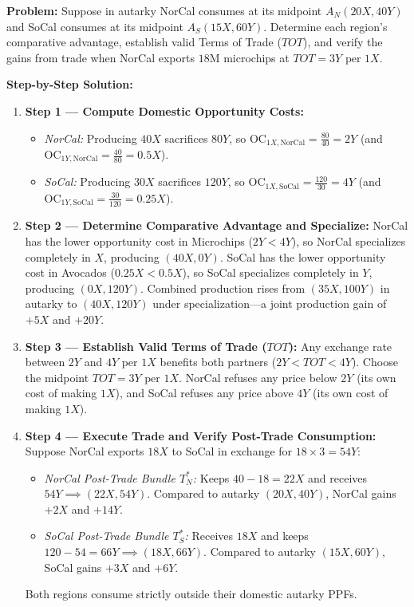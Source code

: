 \documentclass[11pt,letterpaper]{article}
\begin{document}
\begin{casestudy}
\textbf{Problem:} Suppose in autarky NorCal consumes at its midpoint $A_N(20X, 40Y)$ and SoCal consumes at its midpoint $A_S(15X, 60Y)$. Determine each region's comparative advantage, establish valid Terms of Trade ($TOT$), and verify the gains from trade when NorCal exports $18\text{M}$ microchips at $TOT = 3Y\text{ per }1X$.

\medskip
\noindent\textbf{Step-by-Step Solution:}
\begin{enumerate}
    \item \textbf{Step 1 — Compute Domestic Opportunity Costs:}
    \begin{itemize}
        \item \emph{NorCal:} Producing $40X$ sacrifices $80Y$, so $\text{OC}_{1X,\text{NorCal}} = \frac{80}{40} = 2Y$ (and $\text{OC}_{1Y,\text{NorCal}} = \frac{40}{80} = 0.5X$).
        \item \emph{SoCal:} Producing $30X$ sacrifices $120Y$, so $\text{OC}_{1X,\text{SoCal}} = \frac{120}{30} = 4Y$ (and $\text{OC}_{1Y,\text{SoCal}} = \frac{30}{120} = 0.25X$).
    \end{itemize}
    \item \textbf{Step 2 — Determine Comparative Advantage and Specialize:}
    NorCal has the lower opportunity cost in Microchips ($2Y < 4Y$), so NorCal specializes completely in $X$, producing $(40X, 0Y)$. SoCal has the lower opportunity cost in Avocados ($0.25X < 0.5X$), so SoCal specializes completely in $Y$, producing $(0X, 120Y)$. Combined production rises from $(35X, 100Y)$ in autarky to $(40X, 120Y)$ under specialization—a joint production gain of $+5X$ and $+20Y$.
    \item \textbf{Step 3 — Establish Valid Terms of Trade ($TOT$):}
    Any exchange rate between $2Y$ and $4Y$ per $1X$ benefits both partners ($2Y < TOT < 4Y$). Choose the midpoint $TOT = 3Y\text{ per }1X$. NorCal refuses any price below $2Y$ (its own cost of making $1X$), and SoCal refuses any price above $4Y$ (its own cost of making $1X$).
    \item \textbf{Step 4 — Execute Trade and Verify Post-Trade Consumption:}
    Suppose NorCal exports $18X$ to SoCal in exchange for $18 \times 3 = 54Y$:
    \begin{itemize}
        \item \emph{NorCal Post-Trade Bundle $T^*_N$:} Keeps $40 - 18 = 22X$ and receives $54Y \implies (22X, 54Y)$. Compared to autarky $(20X, 40Y)$, NorCal gains $+2X$ and $+14Y$.
        \item \emph{SoCal Post-Trade Bundle $T^*_S$:} Receives $18X$ and keeps $120 - 54 = 66Y \implies (18X, 66Y)$. Compared to autarky $(15X, 60Y)$, SoCal gains $+3X$ and $+6Y$.
    \end{itemize}
    Both regions consume strictly outside their domestic autarky PPFs.
\end{enumerate}
\end{casestudy}
\end{document}
